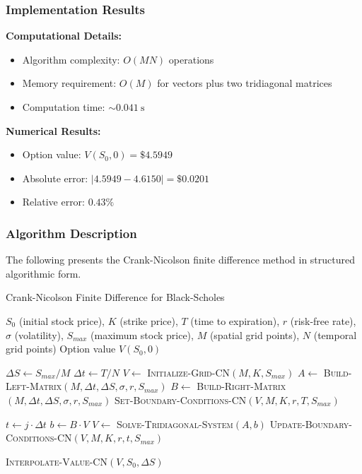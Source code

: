 \documentclass[12pt,a4paper]{article}
\numberwithin{algorithm}{subsection}
\begin{document}
\subsubsection{Implementation Results}

\textbf{Computational Details:}
\begin{itemize}
\item Algorithm complexity: $O(MN)$ operations
\item Memory requirement: $O(M)$ for vectors plus two tridiagonal matrices
\item Computation time: $\sim\SI{0.041}{\second}$
\end{itemize}

\textbf{Numerical Results:}
\begin{itemize}
\item Option value: $V(S_0, 0) = \$4.5949$
\item Absolute error: $|4.5949 - 4.6150| = \$0.0201$
\item Relative error: $0.43\%$
\end{itemize}

\subsubsection{Algorithm Description}

The following presents the Crank-Nicolson finite difference method in structured algorithmic form.

\begin{algorithm}[H]
\caption{Crank-Nicolson Finite Difference for Black-Scholes}
\begin{algorithmic}[1]
\REQUIRE $S_0$ (initial stock price), $K$ (strike price), $T$ (time to expiration), $r$ (risk-free rate), $\sigma$ (volatility), $S_{max}$ (maximum stock price), $M$ (spatial grid points), $N$ (temporal grid points)
\ENSURE Option value $V(S_0, 0)$

\STATE $\Delta S \leftarrow S_{max} / M$
\STATE $\Delta t \leftarrow T / N$
\STATE $V \leftarrow$ \textsc{Initialize-Grid-CN}$(M, K, S_{max})$
\STATE $A \leftarrow$ \textsc{Build-Left-Matrix}$(M, \Delta t, \Delta S, \sigma, r, S_{max})$
\STATE $B \leftarrow$ \textsc{Build-Right-Matrix}$(M, \Delta t, \Delta S, \sigma, r, S_{max})$
\STATE \textsc{Set-Boundary-Conditions-CN}$(V, M, K, r, T, S_{max})$

    \STATE $t \leftarrow j \cdot \Delta t$
    \STATE $b \leftarrow B \cdot V$ 
    \STATE $V \leftarrow$ \textsc{Solve-Tridiagonal-System}$(A, b)$
    \STATE \textsc{Update-Boundary-Conditions-CN}$(V, M, K, r, t, S_{max})$
\ENDFOR

\RETURN \textsc{Interpolate-Value-CN}$(V, S_0, \Delta S)$
\end{algorithmic}
\end{algorithm}
\end{document}
